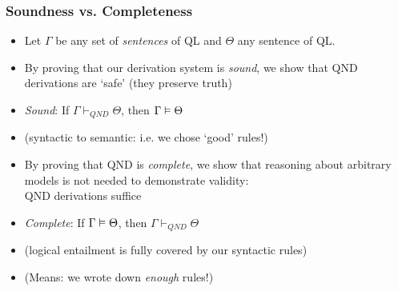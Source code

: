 \iffalse
\begin{frame}
\frametitle{Soundness vs. Completeness}



\begin{itemize}[<+->]

\item Let $\Gamma$ be any set of \textit{sentences} of QL and $\Theta$ any sentence of QL. 

\item By proving that our derivation system is \textit{sound}, we show that QND derivations are `safe' (they preserve truth)

\medskip 

\bi

\item \emph{Sound}: If $\Gamma \vdash_{QND} \Theta$, then $\Gamma \vDash \Theta$

\item (syntactic to semantic: i.e. we chose `good' rules!)

\ei

\bigskip 

\item By proving that QND is \textit{complete}, we show that reasoning about arbitrary models is not needed to demonstrate validity: \\ QND derivations suffice

\medskip 

\bi

\item \emph{Complete}: If $\Gamma \vDash \Theta$, then $\Gamma \vdash_{QND} \Theta$

\item (logical entailment is fully covered by our syntactic rules)

\item (Means: we wrote down \textit{enough} rules!)

\ei

\end{itemize}
\end{frame}

